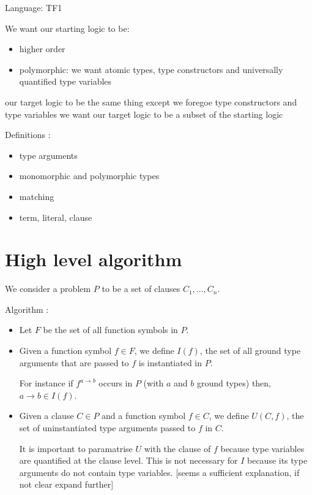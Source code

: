 \documentclass[]{ceurart}
\begin{document}

Language: TF1  %

We want our starting logic to be:
\begin{itemize}
    \item higher order
    \item polymorphic: we want atomic types, type constructors and universally quantified type variables
\end{itemize}
our target logic to be the same thing except we foregoe type constructors and type variables 
we want our target logic to be a subset of the starting logic


Definitions :
\begin{itemize}
   \item type arguments %
   \item monomorphic and polymorphic types
   \item matching %
   \item term, literal, clause  %
\end{itemize}

\section{High level algorithm}

We consider a problem \(P\) to be a set of clauses \(C_1, \dots, C_n\).

Algorithm :
\begin{itemize}
    \item Let \(F\) be the set of all function symbols in \(P\).
    \item Given a function symbol \(f \in F\), we define \(I(f)\), the set of all ground type arguments that are passed to \(f\) is instantiated in \(P\).

    For instance if \(f^{a \rightarrow b}\) occurs in \(P\) (with \(a\) and \(b\) ground types) then, \(a \rightarrow b \in I(f) \).
 \item Given a clause \(C \in P\) and a function symbol \(f \in C\), we define \(U(C, f)\), the set of uninstantiated type arguments passed to \(f\) in \(C\). 

    It is important to paramatrise \(U\) with the clause of \(f\) because type variables are quantified at the clause level. This is not necessary for \(I\) because its type arguments do not contain type variables. [seems a sufficient explanation, if not clear expand further]

\end{itemize}
\end{document}
